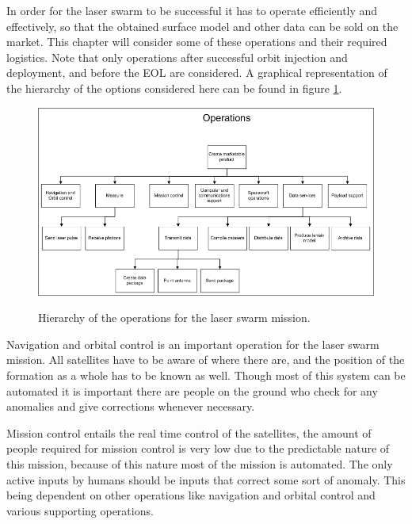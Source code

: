 \label{MTROpsLog}

In order for the laser swarm to be successful it has to operate efficiently and effectively, so that the obtained surface model and other data can be sold on the market. This chapter will consider some of these operations and their required logistics. Note that only operations after successful orbit injection and deployment, and before the \ac{EOL} are considered. A graphical representation of the hierarchy of the options considered here can be found in figure \ref{fig:MTROpsLog}.

\begin{figure}
\centering
\includegraphics[width=1.0\textwidth, angle=0]{chapters/img/MTROpsHier.png}
\label{fig:MTROpsLog}
\caption{Hierarchy of the operations for the laser swarm mission.}
\end{figure}

Navigation and orbital control is an important operation for the laser swarm mission. All satellites have to be aware of where there are, and the position of the formation as a whole has to be known as well. Though most of this system can be automated it is important there are people on the ground who check for any anomalies and give corrections whenever necessary.

Mission control entails the real time control of the satellites, the amount of people required for mission control is very low due to the predictable nature of this mission, because of this nature most of the mission is automated. The only active inputs by humans should be inputs that correct some sort of anomaly. This being dependent on other operations like navigation and orbital control and various supporting operations.

